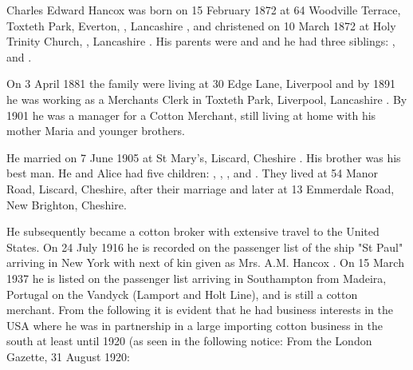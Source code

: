 
Charles Edward Hancox was born on 15 February 1872 at 64 Woodville Terrace, Toxteth Park, Everton, , Lancashire \cite{CEHancoxBirth},  and christened on 10 March 1872 at Holy Trinity Church, , Lancashire \cite{CEHancoxBaptism}. His parents were  and  and he had three siblings: ,  and .

On 3 April 1881 the family were living at 30 Edge Lane, Liverpool \cite{CEHancoxResidence} and by 1891 he was working as a Merchants Clerk in Toxteth Park, Liverpool, Lancashire \cite{CEHancoxOccupation1}.
By 1901 he was a manager for a Cotton Merchant, still living at home with his mother Maria and younger brothers. 

He married  on 7 June 1905 at St Mary's, Liscard, Cheshire \cite{CEHancoxMarriage}.
His brother  was his best man.\cite{PeterKarpinski_2016-04-04}
He and Alice had five children: , , ,  and .
They lived at 54 Manor Road, Liscard, Cheshire, after their marriage\cite{CharlesEdwardHancoxHouse} and later at 13 Emmerdale Road, New Brighton, Cheshire. 

He subsequently became a cotton broker with extensive travel to the United States.  On 24 July 1916 he is recorded on the passenger list of the ship "St Paul" arriving in New York with next of kin given as Mrs. A.M. Hancox \cite{CEHancoxTravel}. On 15 March 1937 he is listed on the passenger list arriving in Southampton from Madeira, Portugal on the Vandyck (Lamport and Holt Line), and is still a cotton merchant. From the following it is evident that he had business interests in the USA where he was in partnership in a large importing cotton business in the south \cite{CEHancoxOccupation2} at least until 1920 (as seen in the following notice:
From the London Gazette, 31 August 1920:

